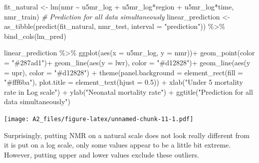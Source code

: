 \documentclass[
]{article}
\newenvironment{Shaded}{\begin{snugshade}}{\end{snugshade}}
\newcommand{\AttributeTok}[1]{\textcolor[rgb]{0.77,0.63,0.00}{#1}}
\newcommand{\CommentTok}[1]{\textcolor[rgb]{0.56,0.35,0.01}{\textit{#1}}}
\newcommand{\FloatTok}[1]{\textcolor[rgb]{0.00,0.00,0.81}{#1}}
\newcommand{\FunctionTok}[1]{\textcolor[rgb]{0.00,0.00,0.00}{#1}}
\newcommand{\NormalTok}[1]{#1}
\newcommand{\OtherTok}[1]{\textcolor[rgb]{0.56,0.35,0.01}{#1}}
\newcommand{\SpecialCharTok}[1]{\textcolor[rgb]{0.00,0.00,0.00}{#1}}
\newcommand{\StringTok}[1]{\textcolor[rgb]{0.31,0.60,0.02}{#1}}
\begin{document}
\begin{Shaded}
\begin{Highlighting}[]
\NormalTok{fit\_natural }\OtherTok{\textless{}{-}} \FunctionTok{lm}\NormalTok{(nmr }\SpecialCharTok{\textasciitilde{}}\NormalTok{ u5mr\_log }\SpecialCharTok{+}\NormalTok{ u5mr\_log}\SpecialCharTok{*}\NormalTok{region }\SpecialCharTok{+}\NormalTok{ u5mr\_log}\SpecialCharTok{*}\NormalTok{time, nmr\_train)}
\CommentTok{\# Prediction for all data simultaneously}
\NormalTok{linear\_prediction  }\OtherTok{\textless{}{-}} \FunctionTok{as\_tibble}\NormalTok{(}\FunctionTok{predict}\NormalTok{(fit\_natural, nmr\_test, }\AttributeTok{interval =} \StringTok{"prediction"}\NormalTok{)) }\SpecialCharTok{\%\textgreater{}\%} 
  \FunctionTok{bind\_cols}\NormalTok{(lm\_pred)}

\NormalTok{linear\_prediction  }\SpecialCharTok{\%\textgreater{}\%} 
  \FunctionTok{ggplot}\NormalTok{(}\FunctionTok{aes}\NormalTok{(}\AttributeTok{x =}\NormalTok{ u5mr\_log, }\AttributeTok{y =}\NormalTok{ nmr))}\SpecialCharTok{+}
  \FunctionTok{geom\_point}\NormalTok{(}\AttributeTok{color =} \StringTok{"\#287ad1"}\NormalTok{)}\SpecialCharTok{+}
  \FunctionTok{geom\_line}\NormalTok{(}\FunctionTok{aes}\NormalTok{(}\AttributeTok{y =}\NormalTok{ lwr), }\AttributeTok{color =} \StringTok{"\#d12828"}\NormalTok{)}\SpecialCharTok{+}
  \FunctionTok{geom\_line}\NormalTok{(}\FunctionTok{aes}\NormalTok{(}\AttributeTok{y =}\NormalTok{ upr), }\AttributeTok{color =} \StringTok{"\#d12828"}\NormalTok{) }\SpecialCharTok{+}
  \FunctionTok{theme}\NormalTok{(}\AttributeTok{panel.background =} \FunctionTok{element\_rect}\NormalTok{(}\AttributeTok{fill =} \StringTok{"\#fff6ba"}\NormalTok{),}
        \AttributeTok{plot.title =} \FunctionTok{element\_text}\NormalTok{(}\AttributeTok{hjust =} \FloatTok{0.5}\NormalTok{)) }\SpecialCharTok{+}
  \FunctionTok{xlab}\NormalTok{(}\StringTok{"Under 5 mortality rate in Log scale"}\NormalTok{) }\SpecialCharTok{+}
  \FunctionTok{ylab}\NormalTok{(}\StringTok{"Neonatal mortality rate"}\NormalTok{) }\SpecialCharTok{+}
  \FunctionTok{ggtitle}\NormalTok{(}\StringTok{"Prediction for all data simultaneously"}\NormalTok{)}
\end{Highlighting}
\end{Shaded}

\texttt{[image: A2\_files/figure-latex/unnamed-chunk-11-1.pdf]}

Surprisingly, putting NMR on a natural scale does not look really
different from it is put on a log scale, only some values appear to be a
little bit extreme. However, putting upper and lower values exclude
these outliers.
\end{document}
